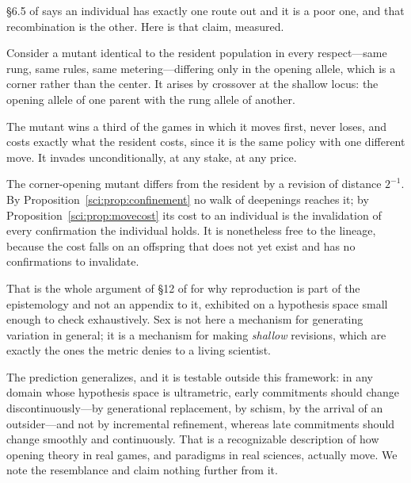 \S6.5 of \chSci says an individual has exactly one route out and it is
a poor one, and that recombination is the other. Here is that claim, measured.

Consider a mutant identical to the resident population in every respect---same
rung, same rules, same metering---differing only in the opening allele, which is
a corner rather than the center. It arises by crossover at the shallow locus: the
opening allele of one parent with the rung allele of another.

\begin{center}
\end{center}

The mutant wins a third of the games in which it moves first, never loses, and
costs exactly what the resident costs, since it is the same policy with one
different move. It invades unconditionally, at any stake, at any price.

\begin{proposition}\label{gam:invading-move-one-no}
The corner-opening mutant differs from the resident by a revision of distance
$2^{-1}$. By Proposition~\ref{sci:prop:confinement} no walk of deepenings reaches it; by Proposition~\ref{sci:prop:movecost}
its cost to an individual is the invalidation of every confirmation the
individual holds. It is nonetheless free to the lineage, because the cost falls
on an offspring that does not yet exist and has no confirmations to invalidate.
\end{proposition}

That is the whole argument of \S12 of \chSci for why reproduction is
part of the epistemology and not an appendix to it, exhibited on a hypothesis
space small enough to check exhaustively. Sex is not here a mechanism for
generating variation in general; it is a mechanism for making \emph{shallow}
revisions, which are exactly the ones the metric denies to a living scientist.

\begin{remark}\label{gam:opening-theory-changes-catastrophe}
The prediction generalizes, and it is testable outside this framework: in any
domain whose hypothesis space is ultrametric, early commitments should change
discontinuously---by generational replacement, by schism, by the arrival of an
outsider---and not by incremental refinement, whereas late commitments should
change smoothly and continuously. That is a recognizable description of how
opening theory in real games, and paradigms in real sciences, actually move. We
note the resemblance and claim nothing further from it.
\end{remark}

